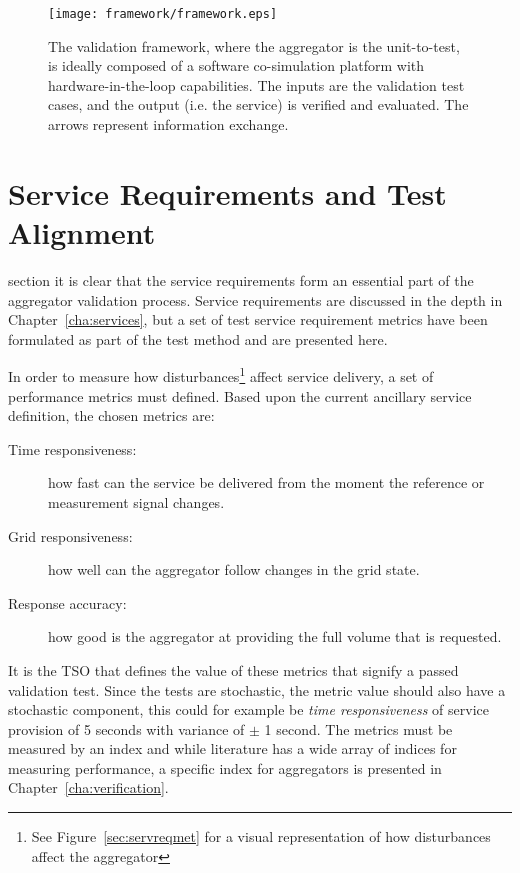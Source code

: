 \begin{figure}[ht]
	\centering
	\caption{The validation framework, where the aggregator is the unit-to-test, is ideally composed of a software co-simulation platform with hardware-in-the-loop capabilities. The inputs are the validation test cases, and the output (i.e. the service) is verified and evaluated. The arrows represent information exchange.}
	\texttt{[image: framework/framework.eps]}\label{fig:frameworkbig}
\end{figure}

\section{Service Requirements and Test Alignment} 
 section it is clear that the service requirements form an essential part of the aggregator validation process. Service requirements are discussed in the depth in Chapter~\ref{cha:services}, but a set of test service requirement metrics have been formulated as part of the test method and are presented here.

In order to measure how disturbances\footnote{See Figure~\ref{sec:servreqmet} for a visual representation of how disturbances affect the aggregator} affect service delivery, a set of performance metrics must defined. Based upon the current ancillary service definition, the chosen metrics are:
\begin{description}
	\item[Time responsiveness:] how fast can the service be delivered from the moment the reference or measurement signal changes.
	\item[Grid responsiveness:] how well can the aggregator follow changes in the grid state.
	\item[Response accuracy:] how good is the aggregator at providing the full volume that is requested.
\end{description}

It is the TSO that defines the value of these metrics that signify a passed validation test. Since the tests are stochastic, the metric value should also have a stochastic component, this could for example be \emph{time responsiveness} of service provision of 5 seconds with variance of $\pm$ 1 second. The metrics must be measured by an index and while literature has a wide array of indices for measuring performance, a specific index for aggregators is presented in Chapter~\ref{cha:verification}.

